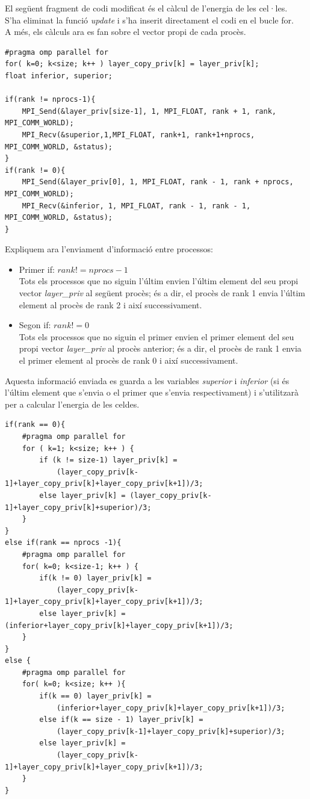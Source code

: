 \documentclass[a4paper, 11pt]{article}
\begin{document}
\vspace{2em}
El següent fragment de codi modificat és el càlcul de l'energia de les cel·les.\\
S'ha eliminat la funció \textit{update} i s'ha inserit directament el codi en el bucle for.\\
A més, els càlculs ara es fan sobre el vector propi de cada procès.
\newpage
\begin{lstlisting}[language = GERONA, firstnumber = 235]
#pragma omp parallel for
for( k=0; k<size; k++ ) layer_copy_priv[k] = layer_priv[k];
float inferior, superior;

if(rank != nprocs-1){
    MPI_Send(&layer_priv[size-1], 1, MPI_FLOAT, rank + 1, rank, MPI_COMM_WORLD);
    MPI_Recv(&superior,1,MPI_FLOAT, rank+1, rank+1+nprocs, MPI_COMM_WORLD, &status);
}
if(rank != 0){
    MPI_Send(&layer_priv[0], 1, MPI_FLOAT, rank - 1, rank + nprocs, MPI_COMM_WORLD);
    MPI_Recv(&inferior, 1, MPI_FLOAT, rank - 1, rank - 1, MPI_COMM_WORLD, &status);
}

\end{lstlisting}
\vspace{2em}
Expliquem ara l'enviament d'informació entre processos:
\begin{itemize}
    \item Primer if: $rank != nprocs-1$\\
        Tots els processos que no siguin l'últim envien l'últim element del seu propi vector \textit{layer\_priv} al següent procès; és a dir, el procès de rank 1 envia l'últim element al procès de rank 2 i així successivament.
    \item Segon if: $rank != 0$\\
        Tots els processos que no siguin el primer envien el primer element del seu propi vector \textit{layer\_priv} al procès anterior; és a dir, el procès de rank 1 envia el primer element al procès de rank 0 i així successivament.
\end{itemize}
Aquesta informació enviada es guarda a les variables \textit{superior} i \textit{inferior} (si és l'últim element que s'envia o el primer que s'envia respectivament) i s'utilitzarà per a calcular l'energia de les celdes.
\newpage 
\begin{lstlisting}[language = GERONA, firstnumber = 252]
if(rank == 0){
    #pragma omp parallel for
    for ( k=1; k<size; k++ ) {
        if (k != size-1) layer_priv[k] = 
            (layer_copy_priv[k-1]+layer_copy_priv[k]+layer_copy_priv[k+1])/3;
        else layer_priv[k] = (layer_copy_priv[k-1]+layer_copy_priv[k]+superior)/3;
    }
}
else if(rank == nprocs -1){
    #pragma omp parallel for
    for( k=0; k<size-1; k++ ) {
        if(k != 0) layer_priv[k] = 
            (layer_copy_priv[k-1]+layer_copy_priv[k]+layer_copy_priv[k+1])/3;
        else layer_priv[k] = (inferior+layer_copy_priv[k]+layer_copy_priv[k+1])/3;
    }
}
else {
    #pragma omp parallel for
    for( k=0; k<size; k++ ){
        if(k == 0) layer_priv[k] = 
            (inferior+layer_copy_priv[k]+layer_copy_priv[k+1])/3;
        else if(k == size - 1) layer_priv[k] = 
            (layer_copy_priv[k-1]+layer_copy_priv[k]+superior)/3;
        else layer_priv[k] = 
            (layer_copy_priv[k-1]+layer_copy_priv[k]+layer_copy_priv[k+1])/3;
    }
}
\end{lstlisting}
\end{document}
